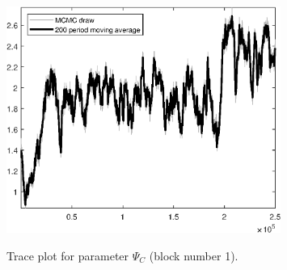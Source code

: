 \begin{figure}[H]
\centering
  \includegraphics[width=0.8\textwidth]{BRS_aggregate/graphs/TracePlot_Psi_C_blck_1}\\
    \caption{Trace plot for parameter ${\Psi_C}$ (block number 1).}
\end{figure}
